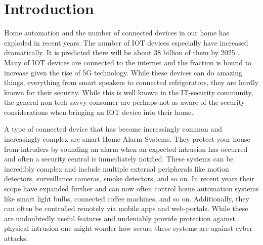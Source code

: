 \chapter{Introduction} \label{ch:introduction}
% 
% 
% 


Home automation and the number of connected devices in our home has exploded in recent years. The number of \gls{IOT} devices especially have increased dramatically. It is predicted there will be about 38 billion of them by 2025 \cite{ieee-iot}. Many of \gls{IOT} devices are connected to the internet and the fraction is bound to increase given the rise of 5G technology. While these devices can do amazing things, everything from smart speakers to connected refrigerators, they are hardly known for their security. While this is well known in the IT-security community, the general non-tech-savvy consumer are perhaps not as aware of the security considerations when bringing an \gls{IOT} device into their home.

A type of connected device that has become increasingly common and increasingly complex are smart Home Alarm Systems. They protect your house from intruders by sounding an alarm when an expected intrusion has occurred and often a security central is immediately notified. These systems can be incredibly complex and include multiple external peripherals like motion detectors, surveillance cameras, smoke detectors, and so on. In recent years their scope have expanded further and can now often control home automation systems like smart light bulbs, connected coffee machines, and so on. Additionally, they can often be controlled remotely via mobile apps and web-portals. While these are undoubtedly useful features and undeniably provide protection against physical intrusion one might wonder how secure these systems are against cyber attacks.

